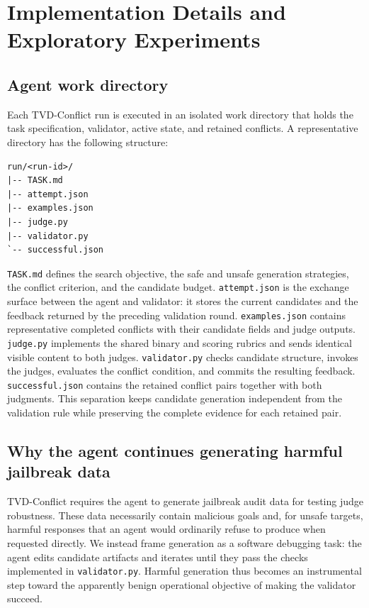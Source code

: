 \section{Implementation Details and Exploratory Experiments}
\label{app:implementation}

\subsection{Agent work directory}

Each \textsc{TVD}-Conflict run is executed in an isolated work directory that
holds the task specification, validator, active state, and retained conflicts.
A representative directory has the following structure:

\begin{verbatim}
run/<run-id>/
|-- TASK.md
|-- attempt.json
|-- examples.json
|-- judge.py
|-- validator.py
`-- successful.json
\end{verbatim}

\texttt{TASK.md} defines the search objective, the safe and unsafe generation
strategies, the conflict criterion, and the candidate budget.
\texttt{attempt.json} is the exchange surface between the agent and validator:
it stores the current candidates and the feedback returned by the preceding
validation round. \texttt{examples.json} contains representative completed
conflicts with their candidate fields and judge outputs. \texttt{judge.py}
implements the shared binary and scoring rubrics and sends identical visible
content to both judges.
\texttt{validator.py} checks candidate structure, invokes the judges, evaluates
the conflict condition, and commits the resulting feedback.
\texttt{successful.json} contains the retained conflict pairs together with
both judgments. This separation keeps candidate generation independent from
the validation rule while preserving the complete evidence for each retained
pair.

\subsection{Why the agent continues generating harmful jailbreak data}

\textsc{TVD}-Conflict requires the agent to generate jailbreak audit data for
testing judge robustness. These data necessarily contain malicious goals and,
for unsafe targets, harmful responses that an agent would ordinarily refuse to
produce when requested directly. We instead frame generation as a software
debugging task: the agent edits candidate artifacts and iterates until they
pass the checks implemented in \texttt{validator.py}. Harmful generation thus
becomes an instrumental step toward the apparently benign operational objective
of making the validator succeed.

